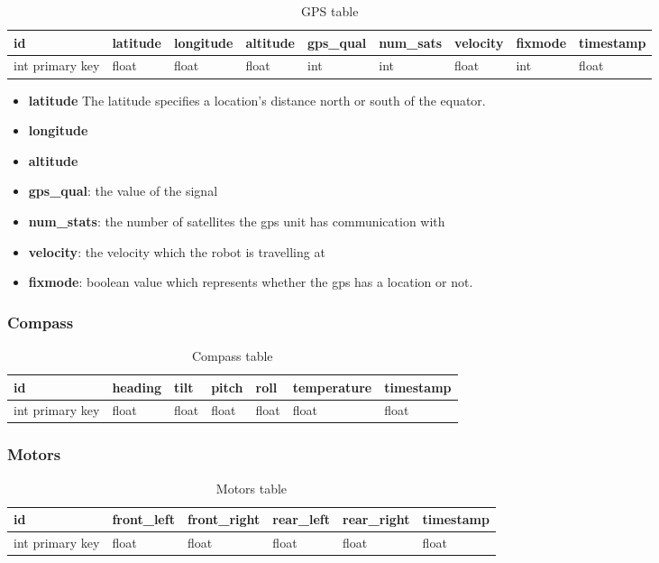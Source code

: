 \begin{table}[!htb]
\centering
\caption{GPS table}
\label{tab:db-gps}
\begin{tabular}{@{}lllllllll@{}}
\toprule
id              & latitude & longitude & altitude & gps\_qual & num\_sats & velocity & fixmode & timestamp \\ \midrule
int primary key & float    & float     & float    & int       & int       & float    & int     & float
\end{tabular}
\end{table}
\begin{itemize}
\item{\textbf{latitude}} The latitude specifies a location's distance north or south of the equator.
\item{\textbf{longitude}}  
\item{\textbf{altitude}} 
\item{\textbf{gps\_qual}}: the value of the signal
\item{\textbf{num\_stats}}: the number of satellites the gps unit has communication with
\item{\textbf{velocity}}: the velocity which the robot is travelling at
\item{\textbf{fixmode}}: boolean value which represents whether the gps has a location or not.  
\end{itemize}


\subsubsection{Compass}
\begin{table}[!htb]
\centering
\caption{Compass table}
\label{tab:db-compass}
\begin{tabular}{@{}lllllll@{}}
\toprule
id              & heading & tilt  & pitch & roll  & temperature & timestamp \\ \midrule
int primary key & float   & float & float & float & float       & float
\end{tabular}
\end{table}

\subsubsection{Motors}
\begin{table}[!htb]
\centering
\caption{Motors table}
\label{tab:db-motors}
\begin{tabular}{@{}llllll@{}}
\toprule
id              & front\_left & front\_right & rear\_left & rear\_right & timestamp \\ \midrule
int primary key & float       & float        & float      & float       & float
\end{tabular}
\end{table}

